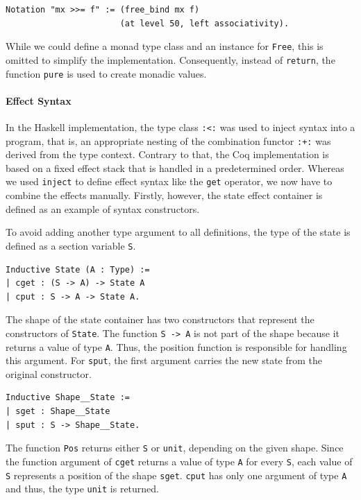 \documentclass[a4paper, 11pt, fleqn, twoside]{scrreprt}
\newcommand{\hinl}[1]{\texttt{#1}}
\newcommand{\cinl}[1]{\texttt{#1}}
\begin{document}
\begin{verbatim}
Notation "mx >>= f" := (free_bind mx f)
                       (at level 50, left associativity).
\end{verbatim}

While we could define a monad type class and an instance for \cinl{Free}, this is omitted to simplify the implementation.
Consequently, instead of \hinl{return}, the function \cinl{pure} is used to create monadic values.

\paragraph{Effect Syntax}

In the Haskell implementation, the type class \hinl{:<:} was used to inject syntax into a program, that is, an appropriate nesting of the combination functor \hinl{:+:} was derived from the type context.
Contrary to that, the Coq implementation is based on a fixed effect stack that is handled in a predetermined  order.
Whereas we used \hinl{inject} to define effect syntax like the \hinl{get} operator, we now have to combine the effects manually.
Firstly, however, the state effect container is defined as an example of syntax constructors.

To avoid adding another type argument to all definitions, the type of the state is defined as a section variable \cinl{S}.

\begin{verbatim}
Inductive State (A : Type) :=
| cget : (S -> A) -> State A
| cput : S -> A -> State A.
\end{verbatim}

The shape of the state container has two constructors that represent the constructors of \cinl{State}.
The function \cinl{S -> A} is not part of the shape because it returns a value of type \cinl{A}.
Thus, the position function is responsible for handling this argument.
For \cinl{sput}, the first argument carries the new state from the original constructor.

\begin{verbatim}
Inductive Shape__State :=
| sget : Shape__State
| sput : S -> Shape__State.
\end{verbatim}

The function \cinl{Pos} returns either \cinl{S} or \cinl{unit}, depending on the given shape.
Since the function argument of \cinl{cget} returns a value of type \cinl{A} for every \cinl{S}, each value of \cinl{S} represents a position of the shape \cinl{sget}.
\cinl{cput} has only one argument of type \cinl{A} and thus, the type \cinl{unit} is returned.
\end{document}
